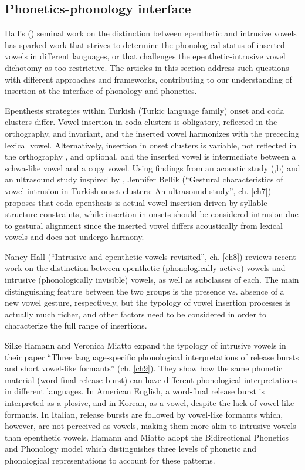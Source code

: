 \documentclass[output=paper,colorlinks,citecolor=brown]{langscibook}
\begin{document}
\subsection{Phonetics-phonology interface}
Hall’s (\citeyear{Hall2004, Hall2006}) seminal work on the distinction between epenthetic and intrusive vowels has sparked work that strives to determine the phonological status of inserted vowels in different languages, or that challenges the epenthetic-intrusive vowel dichotomy as too restrictive. The articles in this section address such questions with different approaches and frameworks, contributing to our understanding of insertion at the interface of phonology and phonetics. 

Epenthesis strategies within Turkish (Turkic language family) onset and coda clusters differ. Vowel insertion in coda clusters is obligatory, reflected in the orthography, and invariant, and the inserted vowel harmonizes with the preceding lexical vowel. Alternatively, insertion in onset clusters is variable, not reflected in the orthography , and optional, and the inserted vowel is intermediate between a schwa-like vowel and a copy vowel. Using findings from an acoustic study (\citealt{Bellik2018, Bellik2019b},b) and an ultrasound study inspired by \citet{DavidsonStone2003}, Jennifer Bellik (“Gestural characteristics of vowel intrusion in Turkish onset clusters: An ultrasound study”, ch. \ref{ch7}) proposes that coda epenthesis is actual vowel insertion driven by syllable structure constraints, while insertion in onsets should be considered intrusion due to gestural alignment since the inserted vowel differs acoustically from lexical vowels and does not undergo harmony.

Nancy Hall (“Intrusive and epenthetic vowels revisited”, ch. \ref{ch8}) reviews recent work on the distinction between epenthetic (phonologically active) vowels and intrusive (phonologically invisible) vowels, as well as subclasses of each. The main distinguishing feature between the two groups is the presence vs. absence of a new vowel gesture, respectively, but the typology of vowel insertion processes is actually much richer, and other factors need to be considered in order to characterize the full range of insertions.

Silke Hamann and Veronica Miatto expand the typology of intrusive vowels in their paper “Three language-specific phonological interpretations of release bursts and short vowel-like formants” (ch. \ref{ch9}). They show how the same phonetic material (word-final release burst) can have different phonological interpretations in different languages. In American English, a word-final release burst is interpreted as a plosive, and in Korean, as a vowel, despite the lack of vowel-like formants. In Italian, release bursts are followed by vowel-like formants which, however, are not perceived as vowels, making them more akin to intrusive vowels than epenthetic vowels. Hamann and Miatto adopt the Bidirectional Phonetics and Phonology model which distinguishes three levels of phonetic and phonological representations to account for these patterns.
\end{document}
